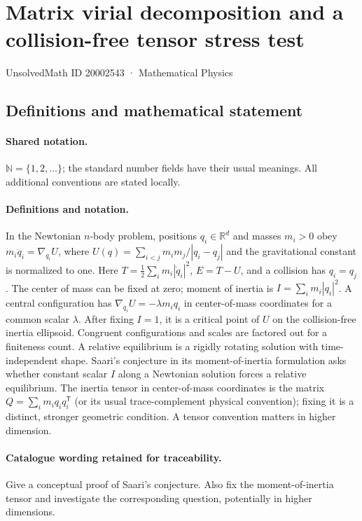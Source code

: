 \documentclass[11pt]{article}
\begin{document}
\setcounter{section}{20002542}
\section{Matrix virial decomposition and a collision-free tensor stress test}\label{20002543}
{\small UnsolvedMath ID 20002543 · Mathematical Physics}
\subsection{Definitions and mathematical statement}

\paragraph{Shared notation.}$\mathbb N=\{1,2,\ldots\}$; the standard number fields have their usual meanings. All additional conventions are stated locally.


\paragraph{Definitions and notation.}In the Newtonian $n$-body problem, positions $q_i\in\mathbb R^d$ and masses $m_i>0$ obey $m_i\ddot q_i=\nabla_{q_i}U$, where $U(q)=\sum_{i<j}m_im_j/|q_i-q_j|$ and the gravitational constant is normalized to one. Here $T=\tfrac12\sum_i m_i|\dot q_i|^2$, $E=T-U$, and a collision has $q_i=q_j$. The center of mass can be fixed at zero; moment of inertia is $I=\sum_i m_i|q_i|^2$. A central configuration has $\nabla_{q_i}U=-\lambda m_iq_i$ in center-of-mass coordinates for a common scalar $\lambda$. After fixing $I=1$, it is a critical point of $U$ on the collision-free inertia ellipsoid. Congruent configurations and scales are factored out for a finiteness count. A relative equilibrium is a rigidly rotating solution with time-independent shape. Saari’s conjecture in its moment-of-inertia formulation asks whether constant scalar $I$ along a Newtonian solution forces a relative equilibrium. The inertia tensor in center-of-mass coordinates is the matrix $Q=\sum_i m_iq_iq_i^{\mathsf T}$ (or its usual trace-complement physical convention); fixing it is a distinct, stronger geometric condition. A tensor convention matters in higher dimension.

\paragraph{Catalogue wording retained for traceability.}
Give a conceptual proof of Saari’s conjecture. Also fix the moment-of-inertia tensor and investigate the corresponding question, potentially in higher dimensions.
\end{document}
